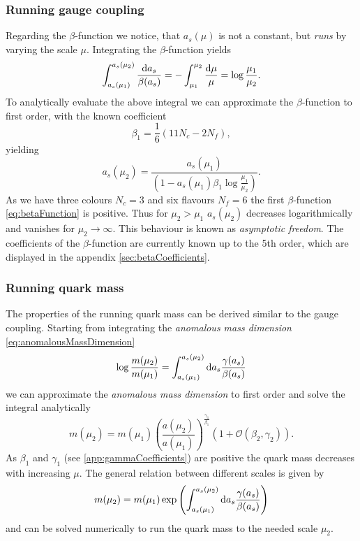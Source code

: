 \documentclass[../../index.tex]{subfiles}
\begin{document}
\subsubsection{Running gauge coupling}
Regarding the $\beta$-function we notice, that $a_s(\mu)$ is not a constant, but
\textit{runs} by varying the scale $\mu$. Integrating the $\beta$-function yields 
\begin{equation}
  \int_{a_s(\mu_1)}^{a_s(\mu_2)}\frac{\dif a_s}{\beta(a_s)} = - \int_{\mu_1}^{\mu_2} \frac{\dif \mu}{\mu} = \log \frac{\mu_1}{\mu_2}.
\end{equation}
To analytically evaluate the above integral we can approximate the $\beta$-function to first order, with the known
coefficient
\begin{equation}
  \beta_1 = \frac{1}{6}(11 N_c - 2 N_f),
\end{equation}
yielding
\begin{equation}
  a_s(\mu_2) = \frac{a_s(\mu_1)}{\left( 1 - a_s(\mu_1) \beta_1 \log\frac{\mu_1}{\mu_2} \right)}.
\end{equation}
As we have three colours $N_c=3$ and six flavours $N_f=6$ the first
$\beta$-function \ref{eq:betaFunction} is positive. Thus for $\mu_2>\mu_1$ $a_s(\mu_2)$ decreases
logarithmically and vanishes for $\mu_2 \to \infty$. This behaviour is known as
\textit{asymptotic freedom}.
The coefficients of the $\beta$-function are currently known up to the 5th
order, which are displayed in the appendix \ref{sec:betaCoefficients}.

\subsubsection{Running quark mass}
The properties of the running quark mass can be derived similar to the gauge
coupling. Starting from integrating the \textit{anomalous mass dimension} \ref{eq:anomalousMassDimension}
\begin{equation}
  \log \frac{m(\mu_2)}{m(\mu_1)} = \int_{a_s(\mu_1)}^{a_s(\mu_2)} \dif a_s \frac{\gamma(a_s)}{\beta(a_s)}
\end{equation}
we can approximate the \textit{anomalous mass dimension} to first order and
solve the integral analytically \cite{Schwab2002}
\begin{equation}
  m(\mu_2) = m(\mu_1)\left( \frac{a(\mu_2)}{a(\mu_1)} \right)^{\frac{\gamma_1}{\beta_1}} \left( 1 + \mathcal{O}(\beta_2, \gamma_2) \right).
\end{equation}
As $\beta_1$ and $\gamma_1$ (see \ref{app:gammaCoefficients}) are positive the
quark mass decreases with increasing $\mu$.
The general relation between different scales is given by
\begin{equation}
  m(\mu_2) = m(\mu_1) \exp \left( \int_{a_s(\mu_1)}^{a_s(\mu_2)} \dif a_s \frac{\gamma(a_s)}{\beta(a_s)}  \right)
\end{equation}
and can be solved numerically to run the quark mass to the needed scale $\mu_2$.
\end{document}
